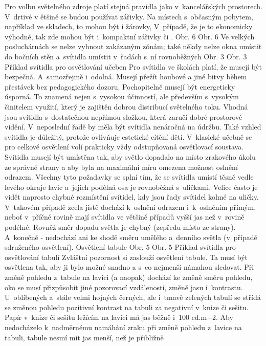 Pro volbu světelného zdroje platí stejná pravidla jako v~kancelářských prostorech. V~drtivé v
ětšině se budou používat zářivky. Na místech s~občasným pobytem, například ve skladech, to mohou být
i žárovky, V~případě, že je to ekonomicky výhodné, tak zde mohou být i~kompaktní zářivky či .
Obr. 6
Obr. 6 Ve velkých posluchárnách se nelze vyhnout zakázaným zónám; také někdy nelze okna umístit
do bočních stěn a~svítidla umístit v~řadách s~ní rovnoběžných
Obr. 3
Obr. 3 Příklad svítidla pro osvětlování učeben
\medskip
Pro svítidla ve školách platí, že musejí být bezpečná. A~samozřejmě i~odolná. Musejí přežít houbové
a jiné bitvy během přestávek bez pedagogického dozoru. Pochopitelně musejí být energeticky úsporná.
To znamená nejen s~vysokou účinností, ale především s~vysokým činitelem využití, který je zajištěn
dobrou distribucí světelného toku. Vhodná jsou svítidla s~dostatečnou nepřímou složkou, která zaručí
dobré prostorové vidění. V~neposlední řadě by měla být svítidla nenáročná na údržbu.
Také vzhled svítidla je důležitý, protože ovlivňuje estetické cítění dětí.
\medskip
V~klasické učebně se pro celkové osvětlení volí prakticky vždy odstupňovaná osvětlovací soustava.
Svítidla musejí být umístěna tak, aby světlo dopadalo na místo zrakového úkolu ze správné strany
a aby byla na maximální míru omezena možnost oslnění odrazem. Všechny tyto požadavky se splní tím,
že se svítidla umístí těsně vedle levého okraje lavic a~jejich podélná osa je rovnoběžná s~uličkami.
Velice často je vidět naprosto chybné rozmístění svítidel, kdy jsou řady svítidel kolmé na uličky.
V~takovém případě zcela jistě dochází k~oslnění odrazem i~k~oslněním přímým, neboť v~příčné rovině mají
svítidla ve většině případů vyšší jas než v~rovině podélné. Rovněž směr dopadu světla je chybný
(zepředu místo ze strany). A~konečně - nedochází ani ke shodě směru umělého a~denního světla (v~případě sdruženého osvětlení).
Osvětlení tabule
Obr. 5
Obr. 5 Příklad svítidla pro osvětlování tabulí
\medskip
Zvláštní pozornost si zaslouží osvětlení tabule. Ta musí být osvětlena tak, aby ji bylo možné snadno
a s~co nejmenší námahou sledovat. Při změně pohledu z~tabule na lavici (a naopak) dochází ke změně směru
pohledu, oko se musí přizpůsobit jiné pozorovací vzdálenosti, změně jasu i~kontrastu. U~oblíbených a~stále
velmi hojných černých, ale i~tmavě zelených tabulí se střídá se změnou pohledu pozitivní kontrast
na tabuli za negativní v~knize či sešitu.
\medskip
Papír v~knize či sešitu ležícím na lavici má jas běžně i~100 cd.m−2. Aby nedocházelo k~nadměrnému
namáhání zraku při změně pohledu z~lavice na tabuli, tabule nesmí mít jas menší, než je přibližně
